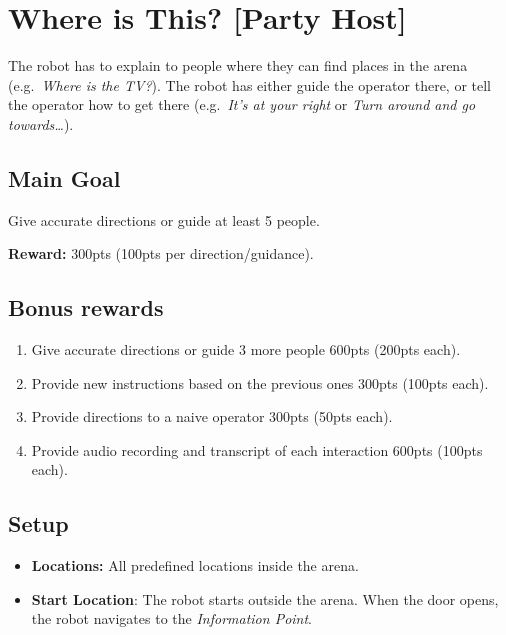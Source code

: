 \section{Where is This? [Party Host]}
The robot has to explain to people where they can find places in the arena (e.g.~\emph{Where is the TV?}). The robot has either guide the operator there, or tell the operator how to get there (e.g.~\emph{It's at your right} or \emph{Turn around and go towards\dots}).


\subsection*{Main Goal}
Give accurate directions or guide at least 5 people.

\noindent\textbf{Reward:} 300pts (100pts per direction/guidance).

\subsection*{Bonus rewards}
\begin{enumerate}[nosep]
	\item Give accurate directions or guide 3 more people 600pts (200pts each).
	\item Provide new instructions based on the previous ones 300pts (100pts each).
	\item Provide directions to a naive operator 300pts (50pts each).
	\item Provide audio recording and transcript of each interaction 600pts (100pts each).
\end{enumerate}

\subsection*{Setup}
\begin{itemize}[nosep]
	\item \textbf{Locations:} All predefined locations inside the arena.

	\item \textbf{Start Location}: The robot starts outside the arena. When the door opens, the robot navigates to the \emph{Information Point}.
\end{itemize}

